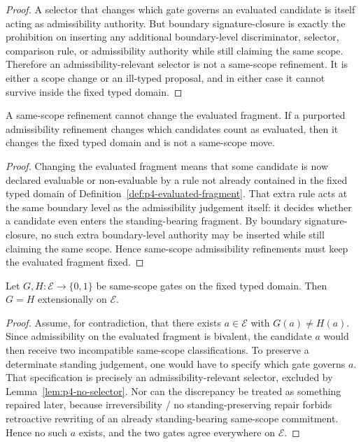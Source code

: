 \begin{proof}
A selector that changes which gate governs an evaluated candidate is itself acting as admissibility authority. But boundary signature-closure is exactly the prohibition on inserting any additional boundary-level discriminator, selector, comparison rule, or admissibility authority while still claiming the same scope. Therefore an admissibility-relevant selector is not a same-scope refinement. It is either a scope change or an ill-typed proposal, and in either case it cannot survive inside the fixed typed domain.
\end{proof}

\begin{manuallemma}
\label{lem:p4-evaluated-fragment-fixity}
A same-scope refinement cannot change the evaluated fragment. If a purported admissibility refinement changes which candidates count as evaluated, then it changes the fixed typed domain and is not a same-scope move.
\end{manuallemma}

\begin{proof}
Changing the evaluated fragment means that some candidate is now declared evaluable or non-evaluable by a rule not already contained in the fixed typed domain of Definition~\ref{def:p4-evaluated-fragment}. That extra rule acts at the same boundary level as the admissibility judgement itself: it decides whether a candidate even enters the standing-bearing fragment. By boundary signature-closure, no such extra boundary-level authority may be inserted while still claiming the same scope. Hence same-scope admissibility refinements must keep the evaluated fragment fixed.
\end{proof}

\begin{manuallemma}
\label{lem:p4-no-competing-gates}
Let $G,H:\mathcal E\to\{0,1\}$ be same-scope gates on the fixed typed domain. Then $G=H$ extensionally on $\mathcal E$.
\end{manuallemma}

\begin{proof}
Assume, for contradiction, that there exists $a\in\mathcal E$ with $G(a)\neq H(a)$. Since admissibility on the evaluated fragment is bivalent, the candidate $a$ would then receive two incompatible same-scope classifications. To preserve a determinate standing judgement, one would have to specify which gate governs $a$. That specification is precisely an admissibility-relevant selector, excluded by Lemma~\ref{lem:p4-no-selector}. Nor can the discrepancy be treated as something repaired later, because irreversibility / no standing-preserving repair forbids retroactive rewriting of an already standing-bearing same-scope commitment. Hence no such $a$ exists, and the two gates agree everywhere on $\mathcal E$.
\end{proof}

